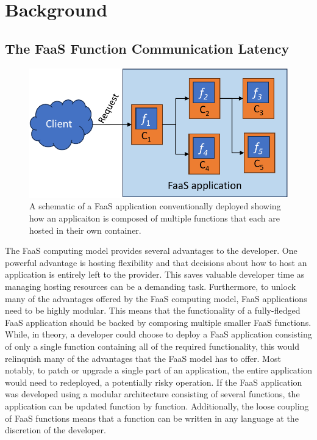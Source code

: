 \section{Background}

\subsection{The FaaS Function Communication Latency}
\label{es:subsec:faas-apps}

\begin{figure}
  \centering
  \includegraphics[width=\columnwidth]{figures/faas_application}
  \caption{\label{es:fig:faas-app} A schematic of a FaaS application conventionally deployed showing how an applicaiton is composed of multiple functions that each are hosted in their own container.}
\end{figure}

The FaaS computing model provides several advantages to the developer. One powerful advantage is hosting flexibility and that decisions about how to host an application is entirely left to the provider. This saves valuable developer time as managing hosting resources can be a demanding task. Furthermore, to unlock many of the advantages offered by the FaaS computing model, FaaS applications need to be highly modular. This means that the functionality of a fully-fledged FaaS application should be backed by composing multiple smaller FaaS functions. While, in theory, a developer could choose to deploy a FaaS application consisting of only a single function containing all of the required functionality, this would relinquish many of the advantages that the FaaS model has to offer. Most notably, to patch or upgrade a single part of an application, the entire application would need to redeployed, a potentially risky operation. If the FaaS application was developed using a modular architecture consisting of several functions, the application can be updated function by function. Additionally, the loose coupling of FaaS functions means that a function can be written in any language at the discretion of the developer.


